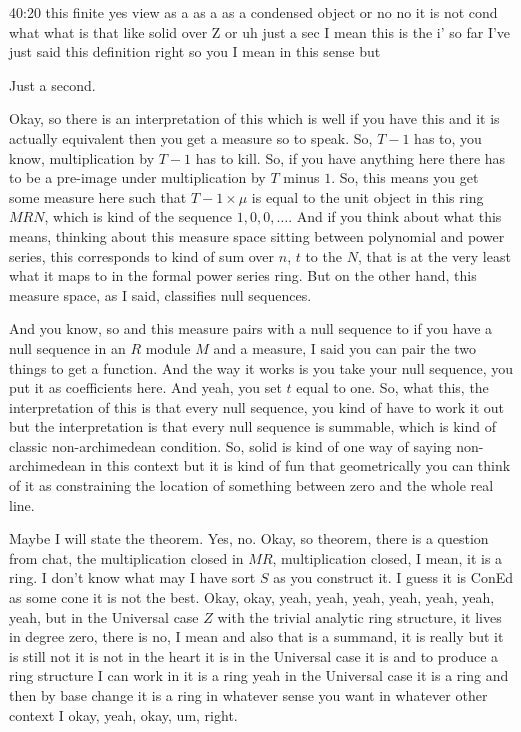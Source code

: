 \begin{unfinished}{40:20}
 this finite yes view as a as a as a condensed object or no no it is not cond what what is that like solid over Z or uh just a sec I mean this is the i' so far I've just said this definition right so you I mean in this sense but

Just a second.

Okay, so there is an interpretation of this which is well if you have this and it is actually equivalent then you get a measure so to speak. So, $T - 1$ has to, you know, multiplication by $T - 1$ has to kill. So, if you have anything here there has to be a pre-image under multiplication by $T$ minus $1$. So, this means you get some measure here such that $T - 1 \times \mu$ is equal to the unit object in this ring $MRN$, which is kind of the sequence $1, 0, 0, \ldots$. And if you think about what this means, thinking about this measure space sitting between polynomial and power series, this corresponds to kind of sum over $n$, $t$ to the $N$, that is at the very least what it maps to in the formal power series ring. But on the other hand, this measure space, as I said, classifies null sequences.

And you know, so and this measure pairs with a null sequence to if you have a null sequence in an $R$ module $M$ and a measure, I said you can pair the two things to get a function. And the way it works is you take your null sequence, you put it as coefficients here. And yeah, you set $t$ equal to one. So, what this, the interpretation of this is that every null sequence, you kind of have to work it out but the interpretation is that every null sequence is summable, which is kind of classic non-archimedean condition. So, solid is kind of one way of saying non-archimedean in this context but it is kind of fun that geometrically you can think of it as constraining the location of something between zero and the whole real line.

Maybe I will state the theorem. Yes, no. Okay, so theorem, there is a question from chat, the multiplication closed in $MR$, multiplication closed, I mean, it is a ring. I don't know what may I have sort $S$ as you construct it. I guess it is ConEd as some cone it is not the best. Okay, okay, yeah, yeah, yeah, yeah, yeah, yeah, yeah, but in the Universal case $Z$ with the trivial analytic ring structure, it lives in degree zero, there is no, I mean and also that is a summand, it is really but it is still not it is not in the heart it is in the Universal case it is and to produce a ring structure I can work in it is a ring yeah in the Universal case it is a ring and then by base change it is a ring in whatever sense you want in whatever other context I okay, yeah, okay, um, right. 


\end{unfinished}
